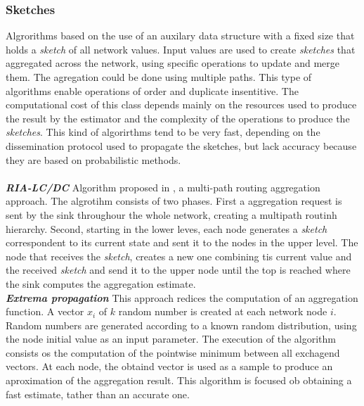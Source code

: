 \subsubsection{Sketches}
Algrorithms based on the use of an auxilary data structure with a fixed size that holds a \textit{sketch} of all network values. Input values are used to create \textit{sketches} that aggregated across the network, using specific operations to update and merge them. The agregation could be done using multiple paths. This type of algorithms enable operations of order and duplicate insentitive. The computational cost of this class depends mainly on the resources used to produce the result by the estimator and the complexity of the operations to produce the \textit{sketches}. This kind of algorirthms tend to be very fast, depending on the dissemination protocol used to propagate the sketches, but lack accuracy because they are based on probabilistic methods.\\
\\
\textbf{\textit{RIA-LC/DC}} Algorithm proposed in \cite{fan2008efficient}, a multi-path routing aggregation approach. The algrotihm consists of two phases. First a aggregation request is sent by the sink throughour the whole network, creating a multipath routinh hierarchy. Second, starting in the lower leves, each node generates a \textit{sketch} correspondent to its current state and sent it to the nodes in the upper level. The node that receives the \textit{sketch}, creates a new one combining tis current value and the received \textit{sketch} and send it to the upper node until the top is reached where the sink computes the aggregation estimate.
\\
\textbf{\textit{Extrema propagation}}
This approach redices the computation of an aggregation function\cite{journals/corr/abs-1110-0725}. A vector $x_i$ of $k$ random number is created at each network node $i$. Random numbers are generated according to a known random distribution, using the node initial value as an input parameter. The execution of the algorithm consists os the computation of the pointwise minimum between all exchagend vectors. At each node, the obtaind vector is used as a sample to produce an aproximation of the aggregation result. This algorithm is focused ob obtaining a fast estimate, tather than an accurate one. 

